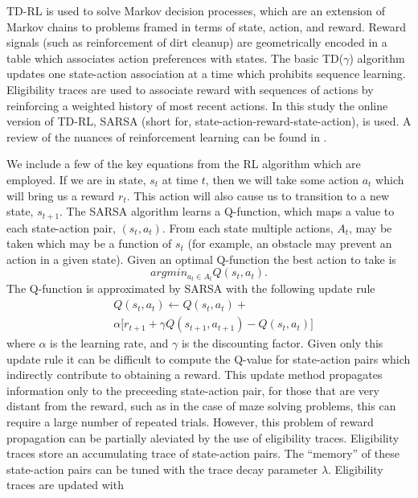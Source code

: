 \documentclass[conference]{IEEEtran}
\begin{document}
TD-RL is used to solve Markov decision processes, which are an extension of
Markov chains to problems framed in terms of state, action, and reward.
Reward signals (such as reinforcement of dirt cleanup) are geometrically encoded
in a table which associates action preferences with states. The basic
TD($\gamma$) algorithm updates one state-action association at a time which
prohibits sequence learning. Eligibility traces are used to associate reward
with sequences of actions by reinforcing a weighted history of most recent
actions. In this study the online version of TD-RL, SARSA (short for,
state-action-reward-state-action), is used. A review of the nuances of
reinforcement learning can be found in \cite{Sutton1998}.

We include a few of the key equations from the RL algorithm which are employed. If we are in state,
$s_t$ at time $t$, then we will take some action $a_t$ which will bring us a
reward $r_t$. This action will also cause us to transition to a new state,
$s_{t+1}$. The SARSA algorithm learns a Q-function, which maps a value to each 
state-action pair, $(s_t,a_t)$. From each state multiple actions, $A_t$, may be taken
which may be a function of $s_t$ (for example, an obstacle may prevent an action
in a given state). Given an optimal Q-function the best action to take is
\begin{equation} argmin_{a_t \in A_t} Q(s_t,a_t).
\end{equation}
\noindent The Q-function is approximated by SARSA with the following update rule
\begin{eqnarray} 
& Q(s_t,a_t) \leftarrow Q(s_t,a_t)+ \nonumber \\ 
& \alpha \big[r_{t+1}+\gamma Q(s_{t+1},a_{t+1}) - Q(s_t,a_t)\big] 
\end{eqnarray}
\noindent where $\alpha$ is the learning rate, and $\gamma$ is the discounting
factor. Given only this update rule it can be difficult to compute the Q-value
for state-action pairs which indirectly contribute to obtaining a reward. This
update method propagates information only to the preceeding state-action pair,
for those that are very distant from the reward, such as in the case of maze
solving problems, this can require a large number of repeated trials. However,
this problem of reward propagation can be partially aleviated by the use of
eligibility traces. Eligibility traces store an accumulating trace of
state-action pairs. The ``memory'' of these state-action pairs can be tuned with
the trace decay parameter $\lambda$. Eligibility traces are updated with
\end{document}
